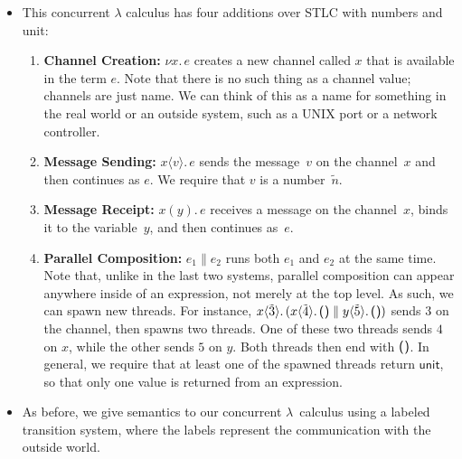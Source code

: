 \documentclass{lecturenotes}
\newcommand{\utype}{\textsf{unit}\xspace}
\newcommand{\unit}{\ensuremath{\textsf{(}\mkern0.5mu\textsf{)}}}
\newcommand{\newchan}[2]{\ensuremath{\nu #1.\,#2}}
\newcommand{\send}[3]{\ensuremath{#1\langle#2\rangle.\,#3}}
\newcommand{\recv}[3]{\ensuremath{#1(#2).\,#3}}
\begin{document}
\begin{itemize}
\item This concurrent $\lambda$ calculus has four additions over STLC with numbers and \utype:
  \begin{enumerate}[(1)]
  \item \textbf{Channel Creation:} $\newchan{x}{e}$ creates a new channel called $x$ that is available in the term $e$.
    Note that there is no such thing as a channel value; channels are just name.
    We can think of this as a name for something in the real world or an outside system, such as a UNIX port or a network controller.
  \item \textbf{Message Sending:} $\send{x}{v}{e}$ sends the message~$v$ on the channel~$x$ and then continues as $e$.
    We require that $v$ is a number~$\tilde{n}$.
  \item \textbf{Message Receipt:} $\recv{x}{y}{e}$ receives a message on the channel~$x$, binds it to the variable~$y$, and then continues as~$e$.
  \item \textbf{Parallel Composition:} $e_1 \parallel e_2$ runs both $e_1$ and $e_2$ at the same time.
    Note that, unlike in the last two systems, parallel composition can appear anywhere inside of an expression, not merely at the top level.
    As such, we can spawn new threads.
    For instance, $\send{x}{\tilde{3}}{(\send{x}{\tilde{4}}{\unit} \parallel\send{y}{\tilde{5}}{\unit})}$ sends $3$ on the channel, then spawns two threads.
    One of these two threads sends $4$ on $x$, while the other sends $5$ on $y$.
    Both threads then end with $\unit$.
    In general, we require that at least one of the spawned threads return $\utype$, so that only one value is returned from an expression.
  \end{enumerate}
\item As before, we give semantics to our concurrent $\lambda$~calculus using a labeled transition system, where the labels represent the communication with the outside world.
\end{itemize}
\end{document}
